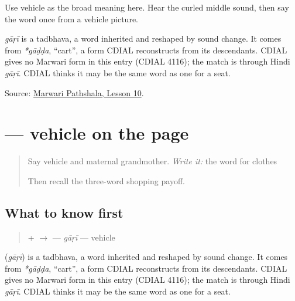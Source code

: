 Use vehicle as the broad meaning here. Hear the curled middle sound, then say the word once from a vehicle picture.

\begin{cousinweb}
\emph{gāṛī} is a tadbhava, a word inherited and reshaped by sound change. It comes from \emph{*gāḍḍa}, \textquotedblleft{}cart\textquotedblright{}, a form CDIAL reconstructs from its descendants. CDIAL gives no Marwari form in this entry (CDIAL 4116); the match is through Hindi \emph{gāṛī}. CDIAL thinks it may be the same word as one for a seat.
\end{cousinweb}

\begin{tcolorbox}[breakable,colback=teal!4,colframe=teal!35!black,title={Before you move on}]
Source: \href{https://www.marwaripathshala.com/marwari-lesson-10-english}{Marwari Pathshala, Lesson 10}.
\end{tcolorbox}
\section[\texorpdfstring{\mw{गाड़ी} (gāṛī)}{गाड़ी (gāṛī)}]{ — vehicle on the page}

\label{lesson:MW-C16-gaadi}



\begin{quote}
Say vehicle and maternal grandmother. \emph{Write it:} the word for clothes

Then recall the three-word shopping payoff.
\end{quote}

\subsection*{What to know first}
\begin{quote}
\textbf{} + \textbf{} $\to$ \textbf{} — \emph{gāṛī} — vehicle
\end{quote}

\begin{cousinweb}
\textbf{} (\emph{gāṛī}) is a tadbhava, a word inherited and reshaped by sound change. It comes from \emph{*gāḍḍa}, \textquotedblleft{}cart\textquotedblright{}, a form CDIAL reconstructs from its descendants. CDIAL gives no Marwari form in this entry (CDIAL 4116); the match is through Hindi \emph{gāṛī}. CDIAL thinks it may be the same word as one for a seat.
\end{cousinweb}

